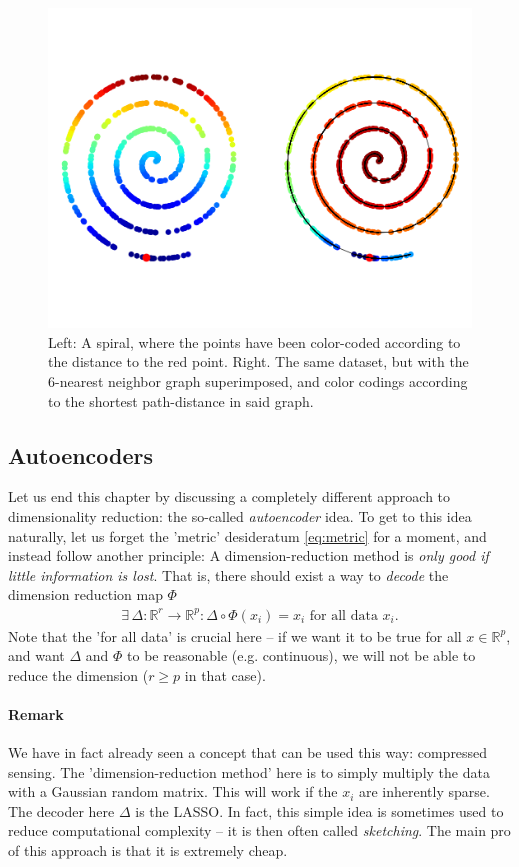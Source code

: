 \documentclass{article}
\newcommand{\R}{\mathbb{R}}
\begin{document}
\begin{figure}
    \centering
    \includegraphics[width=0.5\linewidth]{graphics/distance_isomap.png}
    \caption{Left: A spiral, where the points have been color-coded according to the distance to the red point. Right. The same dataset, but with the $6$-nearest neighbor graph superimposed, and color codings according to the shortest path-distance in said graph.}
    \label{fig:isodistance}
\end{figure}




\subsection{Autoencoders}
Let us end this chapter by discussing a completely different approach to dimensionality reduction: the so-called \emph{autoencoder} idea. To get to this idea naturally, let us forget the 'metric' desideratum \eqref{eq:metric} for a moment, and instead follow another principle: A dimension-reduction method is \emph{only good if little information is lost}. That is, there should exist a way to \emph{decode} the dimension reduction map $\Phi$
\begin{align*}
    \exists \, \Delta: \R^r \to \R^p : \Delta \circ \Phi(x_i) = x_i \text{ for all data $x_i$.}
\end{align*}
Note that the 'for all data' is crucial here -- if we want it to be true for all $x\in \R^p$, and want $\Delta$ and $\Phi$ to be reasonable (e.g. continuous), we will not be able to reduce the dimension ($r\geq p$ in that case).

\paragraph{Remark} We have in fact already seen a concept that can be used this way: compressed sensing. The 'dimension-reduction method' here is to simply multiply the data with a Gaussian random matrix. This will work if the $x_i$ are inherently sparse. The decoder here $\Delta$ is the LASSO. In fact, this simple idea is sometimes used to reduce computational complexity -- it is then often called \emph{sketching}. The main pro of this approach is that it is extremely cheap.
\end{document}
